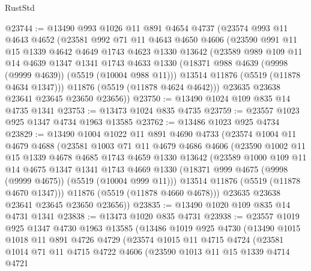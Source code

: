 \begin{lexlean}{RustStd}
\begin{coremodule}
@23744 := @13490
    @993
    @1026
    @11
    @891
    @4654
    @4737
    (@23574
      @993
      @11
      @4643
      @4652
      (@23581
        @992
        @71
        @11
        @4643
        @4650
        @4606
        (@23590
          @991
          @11
          @15
          @1339
          @4642
          @4649
          @1743
          @4623
          @1330
          @13642
          (@23589
            @989
            @109
            @11
            @14
            @4639
            @1347
            @1341
            @1743
            @4633
            @1330
            (@18371 @988 @4639 (@9998 (@9999 @4639)) (@5519 (@10004 @988 @11)))
            @13514
            @11876
            (@5519 (@11878 @4634 @1347)))
          @11876
          (@5519 (@11878 @4624 @4642)))
        @23635
        @23638
        @23641
        @23645
        @23650
        @23656))
@23750 := @13490 @1024 @109 @835 @14 @4735 @1341
@23753 := @13473 @1024 @835 @4735
@23759 := @23557 @1023 @925 @1347 @4734 @1963 @13585
@23762 := @13486 @1023 @925 @4734
@23829 := @13490
    @1004
    @1022
    @11
    @891
    @4690
    @4733
    (@23574
      @1004
      @11
      @4679
      @4688
      (@23581
        @1003
        @71
        @11
        @4679
        @4686
        @4606
        (@23590
          @1002
          @11
          @15
          @1339
          @4678
          @4685
          @1743
          @4659
          @1330
          @13642
          (@23589
            @1000
            @109
            @11
            @14
            @4675
            @1347
            @1341
            @1743
            @4669
            @1330
            (@18371 @999 @4675 (@9998 (@9999 @4675)) (@5519 (@10004 @999 @11)))
            @13514
            @11876
            (@5519 (@11878 @4670 @1347)))
          @11876
          (@5519 (@11878 @4660 @4678)))
        @23635
        @23638
        @23641
        @23645
        @23650
        @23656))
@23835 := @13490 @1020 @109 @835 @14 @4731 @1341
@23838 := @13473 @1020 @835 @4731
@23938 := @23557
    @1019
    @925
    @1347
    @4730
    @1963
    @13585
    (@13486
      @1019
      @925
      @4730
      (@13490
        @1015
        @1018
        @11
        @891
        @4726
        @4729
        (@23574
          @1015
          @11
          @4715
          @4724
          (@23581
            @1014
            @71
            @11
            @4715
            @4722
            @4606
            (@23590
              @1013
              @11
              @15
              @1339
              @4714
              @4721

\end{coremodule}
\end{lexlean}
